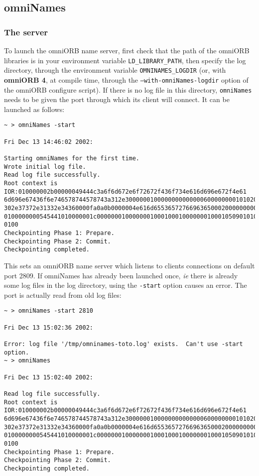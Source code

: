 \subsection{omniNames}

\subsubsection{The server}

To launch the omniORB name server, first check that the path of the omniORB
libraries is in your environment variable \texttt{LD\_LIBRARY\_PATH}, then
specify the log directory, through the environment variable
\texttt{OMNINAMES\_LOGDIR} (or, with \textbf{omniORB 4}, at compile time,
through the \texttt{--with-omniNames-logdir} option of the omniORB configure
script). If there is no log file in this directory, \texttt{omniNames} needs to
be given the port through which its client will connect. It can be launched
as follows:
{\footnotesize
\begin{verbatim}
~ > omniNames -start

Fri Dec 13 14:46:02 2002:

Starting omniNames for the first time.
Wrote initial log file.
Read log file successfully.
Root context is IOR:010000002b00000049444c3a6f6d672e6f72672f436f734e616d696e672f4e61
6d696e67436f6e746578744578743a312e300000010000000000000060000000010102000d0000003134
302e37372e31332e34360000fa0a0b0000004e616d655365727669636500020000000000000008000000
0100000000545441010000001c0000000100000001000100010000000100010509010100010000000901
0100
Checkpointing Phase 1: Prepare.
Checkpointing Phase 2: Commit.
Checkpointing completed.
\end{verbatim}
}

This sets an omniORB name server which listens to clients
connections on default port 2809. If omniNames has already been launched once,
\emph{ie} there is already some log files in the log directory, using the
\texttt{-start} option causes an error. The port is actually read from old
log files:
{\footnotesize
\begin{verbatim}
~ > omniNames -start 2810

Fri Dec 13 15:02:36 2002:

Error: log file '/tmp/omninames-toto.log' exists.  Can't use -start option.
~ > omniNames  

Fri Dec 13 15:02:40 2002:

Read log file successfully.
Root context is IOR:010000002b00000049444c3a6f6d672e6f72672f436f734e616d696e672f4e61
6d696e67436f6e746578744578743a312e300000010000000000000060000000010102000d0000003134
302e37372e31332e34360000fa0a0b0000004e616d655365727669636500020000000000000008000000
0100000000545441010000001c0000000100000001000100010000000100010509010100010000000901
0100
Checkpointing Phase 1: Prepare.
Checkpointing Phase 2: Commit.
Checkpointing completed.
\end{verbatim}
}


